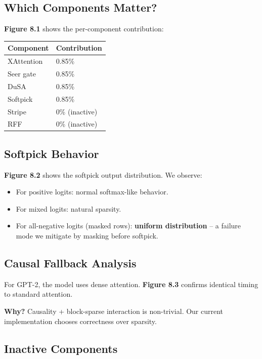 \subsection{Which Components Matter?}

\textbf{Figure 8.1} shows the per-component contribution:

\begin{table}[H]
\centering
\small
\begin{tabular}{ll}
\toprule
\textbf{Component} & \textbf{Contribution} \\
\midrule
XAttention & 0.85\% \\
Seer gate & 0.85\% \\
DuSA & 0.85\% \\
Softpick & 0.85\% \\
Stripe & 0\% (inactive) \\
RFF & 0\% (inactive) \\
\bottomrule
\end{tabular}
\end{table}

\subsection{Softpick Behavior}

\textbf{Figure 8.2} shows the softpick output distribution. We observe:

\begin{itemize}
\item For positive logits: normal softmax-like behavior.
\item For mixed logits: natural sparsity.
\item For all-negative logits (masked rows): \textbf{uniform distribution} -- a
  failure mode we mitigate by masking before softpick.

\end{itemize}
\subsection{Causal Fallback Analysis}

For GPT-2, the model uses dense attention. \textbf{Figure 8.3} confirms identical 
timing to standard attention.

\textbf{Why?} Causality + block-sparse interaction is non-trivial. Our current 
implementation chooses correctness over sparsity.

\subsection{Inactive Components}

